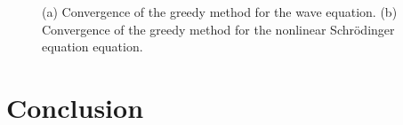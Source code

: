\begin{figure}

\begin{minipage}{.5\linewidth}
\centering
{}
\end{minipage}%
\begin{minipage}{.5\linewidth}
\centering
{}
\end{minipage}\par\medskip
\centering

\caption{ (a) Convergence of the greedy method for the wave equation. (b) Convergence of the greedy method for the nonlinear Schr\"odinger equation equation. }
\label{fig:NuRe:5}
\end{figure}

\section{Conclusion} \label{p1.sec:Con:1}

